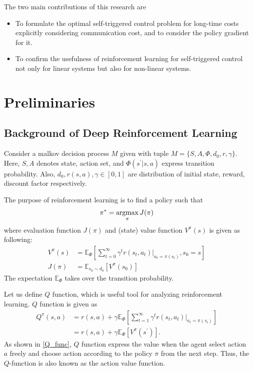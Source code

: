 \documentclass[english, dvipdfmx]{ampmt}             %
\newcommand{\argmax}{\mathop{\rm argmax}\limits}
\newcommand{\expect}{\mathbb{E}}
\begin{document}
The two main contributions of this research are
\begin{itemize}
	\item To formulate the optimal self-triggered control problem for long-time costs explicitly considering communication cost, and to consider the policy gradient for it.
	\item To confirm the usefulness of reinforcement learning for self-triggered control not only for linear systems but also for non-linear systems.
\end{itemize}

\section{Preliminaries}
\subsection{Background of Deep Reinforcement Learning}
Consider a malkov decision process $M$ given with tuple $M=\{S,A,\Phi,d_0,r,\gamma\}$. Here, $S,A$ denotes state, action set, and $\Phi(s^{'}|s,a)$ express transition probability. Also, $d_0,r(s,a),\gamma\in[0,1]$ are distribution of initial state, reward, discount factor respectively. \par
The purpose of reinforcement learning is to find a policy such that
\begin{equation}
	\pi^{*}=\argmax_{\pi}J(\pi) \label{purpose_of_rl}
\end{equation} 
where evaluation function $J(\pi)$ and (state) value function $V^{\pi}(s)$ is given as following:
\begin{align}
	V^{\pi}(s) &= \expect_{\Phi}\left[\sum_{t=0}^{\infty}\gamma^tr(s_t, a_t)|_{a_t=\pi(s_t)}, s_0 = s\right]\\
	J(\pi) &= \expect_{s_0\sim d_0}[V^{\pi}(s_0)]
\end{align}
The expectation $\expect_{\Phi}$ takes over the transition probability.\par
Let us define $Q$ function, which is useful tool for analyzing reinforcement learning. $Q$ function is given as 
\begin{align}
	Q^{\pi}(s,a) &= r(s, a) + \gamma\expect_{\Phi}\left[\sum_{t=1}^{\infty}\gamma^tr(s_t, a_t)|_{a_t=\pi(s_t)} \right]\nonumber\\
			    &= r(s, a) + \gamma \expect_{\Phi}[V^{\pi}(s^{\prime})]. \label{Q_func}
\end{align}
As shown in \eqref{Q_func}, $Q$ function express the value when the agent select action $a$ freely and choose action according to the policy $\pi$ from the next step. Thus, the $Q$-function is also known as the action value function.
\end{document}
